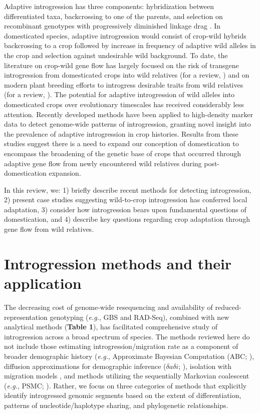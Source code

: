 \documentclass[11pt]{article}
\begin{document}
Adaptive introgression has three components: hybridization between differentiated taxa, backcrossing to one of the parents, and selection on recombinant genotypes with progressively diminished linkage drag \citep{barton2001role}.
In domesticated species, adaptive introgression would consist of crop-wild hybrids backcrossing to a crop followed by increase in frequency of adaptive wild alleles in the crop and selection against undesirable wild background.
To date, the literature on crop-wild gene flow has largely focused on the risk of transgene introgression from domesticated crops into wild relatives (for a review, \citealt{stewart2003transgene}) and on modern plant breeding efforts to introgress desirable traits from wild relatives (for a review, \citealt{Dempewolf2017}).
The potential for adaptive introgression of wild alleles into domesticated crops over evolutionary timescales has received considerably less attention.
Recently developed methods have been applied to high-density marker data to detect genome-wide patterns of introgression, granting novel insight into the prevalence of adaptive introgression in crop histories.
Results from these studies suggest there is a need to expand our conception of domestication to encompass the broadening of the genetic base of crops that occurred through adaptive gene flow from newly encountered wild relatives during post-domestication expansion.

In this review, we: 1) briefly describe recent methods for detecting introgression, 2) present case studies suggesting wild-to-crop introgression has conferred local adaptation, 3) consider how introgression bears upon fundamental questions of domestication, and 4) describe key questions regarding crop adaptation through gene flow from wild relatives.


\section*{Introgression methods and their application}


The decreasing cost of genome-wide resequencing and availability of reduced-representation genotyping (\emph{e.g.}, GBS and RAD-Seq), combined with new analytical methods (\textbf{Table 1}), has facilitated comprehensive study of introgression across a broad spectrum of species.
The methods reviewed here do not include those estimating introgression\slash migration rate as a component of broader demographic history (\emph{e.g.}, Approximate Bayesian Computation (ABC; \citealt{beaumont2002}), diffusion approximations for demographic inference ($\delta a\delta i$; \citealt{gutenkunst2009}), isolation with migration models \citep{hey2004}, and methods utilizing the sequentially Markovian coalescent (\emph{e.g.}, PSMC; \citealt{li2011}). 
Rather, we focus on three categories of methods that explicitly identify introgressed genomic segments based on the extent of differentiation, patterns of nucleotide/haplotype sharing, and phylogenetic relationships.
\end{document}
